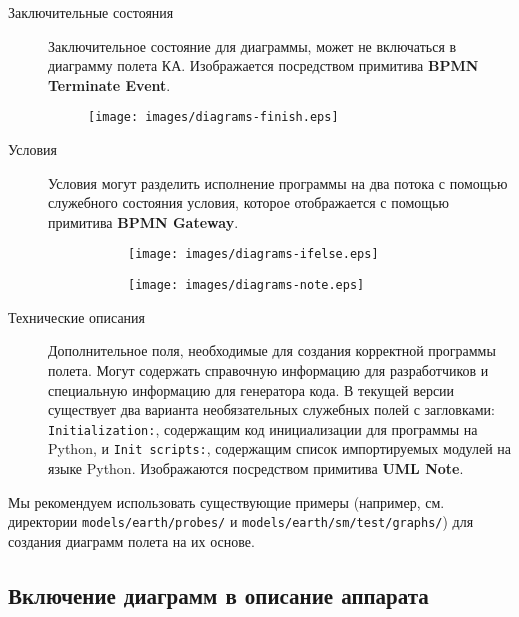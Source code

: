 \documentclass[12pt,a4paper]{article}
\begin{document}
\begin{description}
\item[Заключительные состояния] Заключительное состояние для диаграммы, может не
  включаться в диаграмму полета КА. Изображается посредством примитива \textbf{BPMN
    Terminate Event}.

\begin{figure}[h]
  \begin{center}
    \texttt{[image: images/diagrams-finish.eps]}
  \end{center}
\end{figure}

\item[Условия] Условия могут разделить исполнение программы на два потока с помощью
  служебного состояния условия, которое отображается с помощью примитива \textbf{BPMN
    Gateway}.
  
\begin{figure}[h]
  \begin{center}
    \begin{subfigure}{0.4\textwidth}
      \texttt{[image: images/diagrams-ifelse.eps]}
    \end{subfigure}
    \hfill
    \begin{subfigure}{0.4\textwidth}
      \texttt{[image: images/diagrams-note.eps]}
    \end{subfigure}
  \end{center}
\end{figure}

\item[Технические описания] Дополнительное поля, необходимые для создания корректной
  программы полета. Могут содержать справочную информацию для разработчиков и специальную
  информацию для генератора кода. В текущей версии существует два варианта необязательных
  служебных полей с загловками: \verb'Initialization:', содержащим код инициализации для
  программы на Python, и \verb'Init scripts:', содержащим список импортируемых модулей на
  языке Python. Изображаются посредством примитива \textbf{UML Note}.

\end{description}

Мы рекомендуем использовать существующие примеры (например, см. директории
\verb'models/earth/probes/' и \verb'models/earth/sm/test/graphs/') для создания диаграмм
полета на их основе.

\subsection*{Включение диаграмм в описание аппарата}
\end{document}
